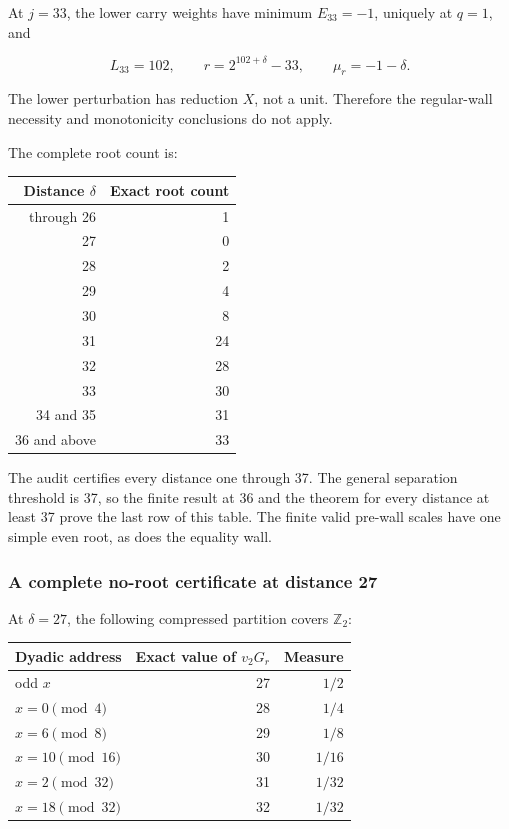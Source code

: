 \documentclass[11pt,letterpaper]{article}
\begin{document}
At \(j=33\), the lower carry weights have minimum \(E_{33}=-1\), uniquely at \(q=1\), and

\[
L_{33}=102,\qquad r=2^{102+\delta}-33,\qquad\mu_r=-1-\delta.
\]

The lower perturbation has reduction \(X\), not a unit. Therefore the regular-wall necessity and monotonicity conclusions do not apply.

The complete root count is:

\begin{longtable}[]{@{}rr@{}}
\toprule\noalign{}
Distance \(\delta\) & Exact root count \\
\midrule\noalign{}
\endhead
\bottomrule\noalign{}
\endlastfoot
1 through 26 & 1 \\
27 & 0 \\
28 & 2 \\
29 & 4 \\
30 & 8 \\
31 & 24 \\
32 & 28 \\
33 & 30 \\
34 and 35 & 31 \\
36 and above & 33 \\
\end{longtable}

The audit certifies every distance one through 37. The general separation threshold is 37, so the finite result at 36 and the theorem for every distance at least 37 prove the last row of this table. The finite valid pre-wall scales have one simple even root, as does the equality wall.

\subsubsection{A complete no-root certificate at distance 27}\label{a-complete-no-root-certificate-at-distance-27}

At \(\delta=27\), the following compressed partition covers \(\mathbb Z_2\):

\begin{longtable}[]{@{}lrr@{}}
\toprule\noalign{}
Dyadic address & Exact value of \(v_2G_r\) & Measure \\
\midrule\noalign{}
\endhead
\bottomrule\noalign{}
\endlastfoot
odd \(x\) & 27 & \(1/2\) \\
\(x=0\pmod4\) & 28 & \(1/4\) \\
\(x=6\pmod8\) & 29 & \(1/8\) \\
\(x=10\pmod{16}\) & 30 & \(1/16\) \\
\(x=2\pmod{32}\) & 31 & \(1/32\) \\
\(x=18\pmod{32}\) & 32 & \(1/32\) \\
\end{longtable}
\end{document}
